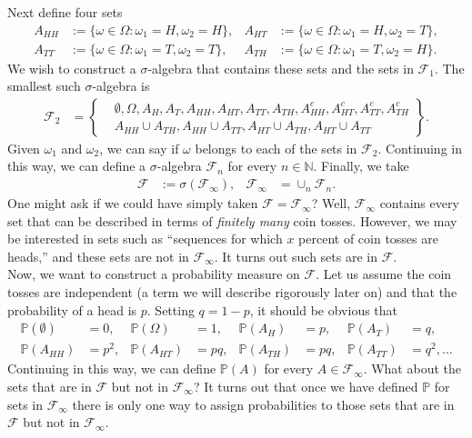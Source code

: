 \documentclass[12pt]{book}
\numberwithin{equation}{chapter}
\theoremstyle{plain}
\numberwithin{theorem}{section}
\theoremstyle{definition}
\numberwithin{exercise}{chapter}
\newcommand{\<}{\langle}
\renewcommand{\>}{\rangle}
\renewcommand{\(}{\left(}
\renewcommand{\)}{\right)}
\renewcommand{\[}{\left[}
\renewcommand{\]}{\right]}
\newcommand\Pb{\mathds{P}}
\newcommand\Nb{\mathds{N}}
\newcommand\Fc{\mathscr{F}}
\newcommand\om{\omega}
\newcommand\Om{\Omega}
\newcommand\sig{\sigma}
\begin{document}
Next define four sets
\begin{align}
A_{HH}
	&:=	\{ \om \in \Om : \om_1 = H , \om_2 = H \} , &
A_{HT}
	&:=	\{ \om \in \Om : \om_1 = H , \om_2 = T \} , \\
A_{TT}
	&:=	\{ \om \in \Om : \om_1 = T , \om_2 = T \} , &
A_{TH}
	&:=	\{ \om \in \Om : \om_1 = T , \om_2 = H \} .
\end{align}
We wish to construct a $\sig$-algebra that contains these sets and the sets in $\Fc_1$.  The smallest such $\sig$-algebra is
\begin{align}
\Fc_2
	&=	\left\{ \begin{aligned} 
			&	\emptyset, \Om, A_H , A_T, A_{HH}, A_{HT}, A_{TT}, A_{TH}, A_{HH}^c , A_{HT}^c, A_{TT}^c, A_{TH}^c \\ 
			&	A_{HH} \cup A_{TH}, A_{HH} \cup A_{TT} , A_{HT} \cup A_{TH} , A_{HT} \cup A_{TT}
			\end{aligned} \right\} .
\end{align}
Given $\om_1$ and $\om_2$, we can say if $\om$ belongs to each of the sets in $\Fc_2$.  Continuing in this way, we can define a $\sig$-algebra $\Fc_n$ for every $n \in \Nb$.  Finally, we take
\begin{align}
\Fc
	&:=	\sig( \Fc_\infty ) , &
\Fc_\infty
	&=	\cup_n \Fc_n	.
\end{align}
One might ask if we could have simply taken $\Fc = \Fc_\infty$?  Well, $\Fc_\infty$ contains every set that can be described in terms of \emph{finitely many} coin tosses.  However, we may be interested in sets such as ``sequences for which $x$ percent of coin tosses are heads,'' and these sets are not in $\Fc_\infty$.  It turns out such sets are in $\Fc$.
\\[0.5em]
Now, we want to construct a probability measure on $\Fc$.  Let us assume the coin tosses are independent (a term we will describe rigorously later on) and that the probability of a head is $p$.  Setting $q = 1-p$, it should be obvious that
\begin{align}
\Pb( \emptyset )
	&=	0 , &
\Pb( \Om ) 
	&=	1 , &
\Pb( A_H )
	&=	p , &
\Pb( A_T )
	&=	q , \\
\Pb( A_{HH} )
	&=	p^2 , &
\Pb( A_{HT} ) 
	&=	p q , &
\Pb( A_{TH} )
	&=	p q , &
\Pb( A_{TT} )
	&=	q^2 , \ldots
\end{align}
Continuing in this way, we can define $\Pb(A)$ for every $A \in \Fc_\infty$.  What about the sets that are in $\Fc$ but not in $\Fc_\infty$?  It turns out that once we have defined $\Pb$ for sets in $\Fc_\infty$ there is only one way to assign probabilities to those sets that are in $\Fc$ but not in $\Fc_\infty$.
\end{document}
